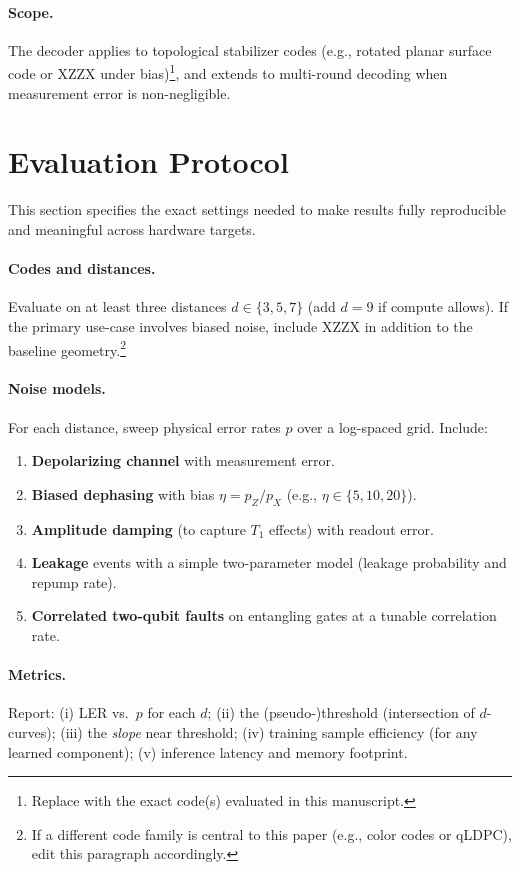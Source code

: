 \documentclass[conference]{IEEEtran}
\begin{document}
    \paragraph{Scope.} The decoder applies to topological stabilizer codes (e.g., rotated planar surface code or XZZX 
under bias)\footnote{Replace with the exact code(s) evaluated in this manuscript.}, and extends to multi-round decoding 
when measurement error is non-negligible.

    \clearpage
    \section{Evaluation Protocol}
    \label{sec:evaluation}
    \noindent This section specifies the exact settings needed to make results fully reproducible and meaningful across 
hardware targets.

    \paragraph{Codes and distances.} Evaluate on at least three distances $d\in\{3,5,7\}$ (add $d=9$ if compute 
allows). If the primary use-case involves biased noise, include XZZX in addition to the baseline geometry.\footnote{If 
a different code family is central to this paper (e.g., color codes or qLDPC), edit this paragraph accordingly.}

    \paragraph{Noise models.} For each distance, sweep physical error rates $p$ over a log-spaced grid. Include:
    \begin{enumerate}
      \item \textbf{Depolarizing channel} with measurement error.
      \item \textbf{Biased dephasing} with bias $\eta = p_Z / p_X$ (e.g., $\eta\in\{5,10,20\}$).
      \item \textbf{Amplitude damping} (to capture $T_1$ effects) with readout error.
      \item \textbf{Leakage} events with a simple two-parameter model (leakage probability and repump rate).
      \item \textbf{Correlated two-qubit faults} on entangling gates at a tunable correlation rate.
    \end{enumerate}

    \paragraph{Metrics.} Report: (i) LER vs.\ $p$ for each $d$; (ii) the (pseudo-)threshold (intersection of $d$-curves); 
(iii) the \emph{slope} near threshold; (iv) training sample efficiency (for any learned component); (v) inference latency 
and memory footprint.
\end{document}
